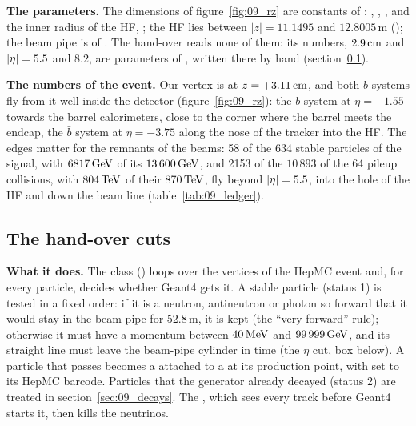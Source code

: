 \textbf{The parameters.} The dimensions of figure~\ref{fig:09_rz} are constants of
: , ,
,  and the inner radius of the HF, ; the HF lies between $|z|=11.1495$ and $12.8005$\,m
(); the beam pipe is  of
. The hand-over reads none of them: its numbers,
$2.9\,\mathrm{cm}$ and $|\eta|=5.5$ and $8.2$, are parameters of , written there by hand
(section~\ref{sec:09_cuts}).

\textbf{The numbers of the event.} Our vertex is at $z=+3.11\,\mathrm{cm}$, and both $b$ systems fly from it well inside
the detector (figure~\ref{fig:09_rz}): the $b$ system at $\eta=-1.55$ towards the barrel calorimeters, close to the
corner where the barrel meets the endcap, the $\bar b$ system at $\eta=-3.75$ along the nose of the tracker into
the HF. The edges matter for the remnants of the beams: 58 of the 634 stable particles of the signal, with
$6817\,\mathrm{GeV}$ of its $13\,600\,\mathrm{GeV}$, and 2153 of the $10\,893$ of the 64 pileup collisions, with $804\,\mathrm{TeV}$ of their
$870\,\mathrm{TeV}$, fly beyond $|\eta|=5.5$, into the hole of the HF and down the beam line (table~\ref{tab:09_ledger}).

\subsection{The hand-over cuts}
\label{sec:09_cuts}

\textbf{What it does.} The class  () loops over the
vertices of the HepMC event and, for every particle, decides whether Geant4 gets it. A stable particle (status 1)
is tested in a fixed order: if it is a neutron, antineutron or photon so forward that it would stay in the beam
pipe for 52.8\,m, it is kept (the ``very-forward'' rule); otherwise it must have a momentum between $40\,\mathrm{MeV}$ and
$99\,999\,\mathrm{GeV}$, and its straight line must leave the beam-pipe cylinder in time (the $\eta$ cut, box below). A
particle that passes becomes a  attached to a  at its production
point, with  set to its HepMC barcode. Particles that the generator already decayed (status 2) are
treated in section~\ref{sec:09_decays}. The , which sees every track before Geant4 starts it,
then kills the neutrinos.

